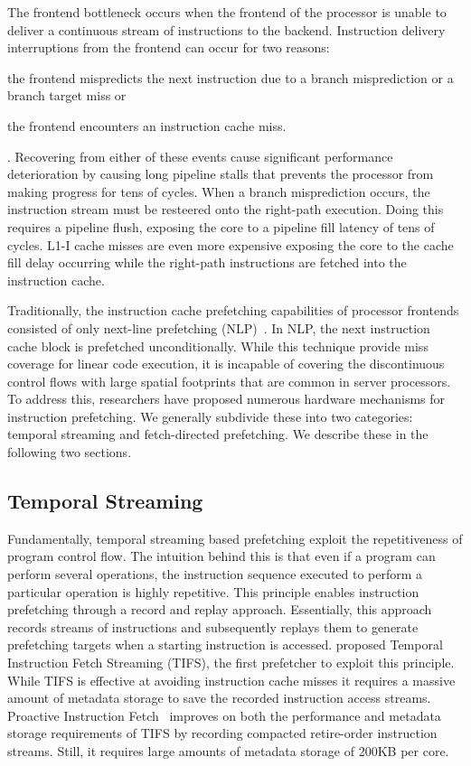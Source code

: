 \documentclass[../main.tex]{subfiles}
\begin{document}
\begin{refsection}
The frontend bottleneck occurs when the frontend of the processor is
unable to deliver a continuous stream of instructions to the backend.
Instruction delivery interruptions from the frontend can occur for two
reasons: \begin{inparaenum}[1)] \item the frontend mispredicts the
  next instruction due to a branch misprediction or a branch target
  miss or \item the frontend encounters an instruction cache
  miss.\end{inparaenum}. Recovering from either of these events cause
significant performance deterioration by causing long pipeline stalls
that prevents the processor from making progress for tens of
cycles. When a branch misprediction occurs, the instruction stream
must be resteered onto the right-path execution. Doing this requires a
pipeline flush, exposing the core to a pipeline fill latency of tens
of cycles. L1-I cache misses are even more expensive exposing the core
to the cache fill delay occurring while the right-path instructions are
fetched into the instruction cache.

Traditionally, the instruction cache prefetching capabilities of
processor frontends consisted of only next-line prefetching
(NLP)~\cite{nextline_pref}. In NLP, the next instruction cache block
is prefetched unconditionally. While this technique provide miss
coverage for linear code execution, it is incapable of covering the
discontinuous control flows with large spatial footprints that are
common in server processors. To address this, researchers have
proposed numerous hardware mechanisms for instruction prefetching. We
generally subdivide these into two categories: temporal streaming and
fetch-directed prefetching. We describe these in the following two
sections.

\subsection{Temporal Streaming} Fundamentally, temporal streaming
based prefetching exploit the repetitiveness of program control
flow. The intuition behind this is that even if a program can perform
several operations, the instruction sequence executed to perform a
particular operation is highly repetitive. This principle enables
instruction prefetching through a record and replay
approach. Essentially, this approach records streams of instructions
and subsequently replays them to generate prefetching targets when a
starting instruction is accessed. \textcite{ferdman08_tempor} proposed
Temporal Instruction Fetch Streaming (TIFS), the first prefetcher to
exploit this principle. While TIFS is effective at avoiding
instruction cache misses it requires a massive amount of metadata
storage to save the recorded instruction access streams.  Proactive
Instruction Fetch~\cite{ferdman11_proac_instr_fetch} improves on both
the performance and metadata storage requirements of TIFS by recording
compacted retire-order instruction streams. Still, it requires large
amounts of metadata storage of 200KB per core.  %


\end{refsection}
\end{document}
